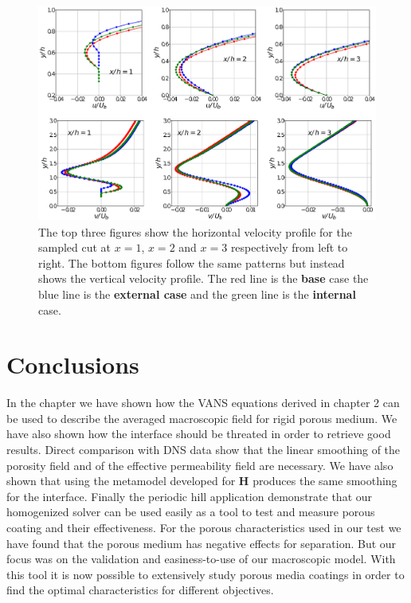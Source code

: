 \begin{figure}[H]
	\centering
	\includegraphics[width=1\linewidth]{chapter_5/figure/cuts_hill}
	\caption{The top three figures show the horizontal velocity profile for the sampled cut at $x=1$, $x=2$ and $x=3$ respectively from left to right. The bottom figures follow the same patterns but instead shows the vertical velocity profile. The red line is the \textbf{base} case the blue line is the \textbf{external case} and the green line is the \textbf{internal} case.}
	\label{fig:cuts_hill}
\end{figure}


\section{Conclusions}

In the chapter we have shown how the VANS equations derived in chapter 2 can be used to describe the averaged macroscopic field for rigid porous medium. We have also shown how the interface should be threated in order to retrieve good results. Direct comparison with DNS data show that the linear smoothing of the porosity field and of the effective permeability field are necessary. We have also shown that using the metamodel developed for $\mathbf{H}$ produces the same smoothing for the interface. Finally the periodic hill application demonstrate that our homogenized solver can be used easily as a tool to test and measure porous coating and their effectiveness.
For the porous characteristics used in our test we have found that the porous medium has negative effects for separation. But our focus was on the validation and easiness-to-use of our macroscopic model. With this tool it is now possible to extensively study porous media coatings in order to find the optimal characteristics for different objectives.
